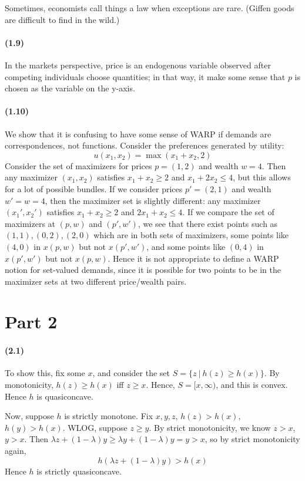 \documentclass[10pt,letter]{article}
\begin{document}
Sometimes, economists call things a law when exceptions are rare. (Giffen goods are difficult to find in the wild.)
\paragraph{(1.9)}
In the markets perspective, price is an endogenous variable observed after competing individuals choose quantities; in that way, it make some sense that $p$ is chosen as the variable on the y-axis.
\paragraph{(1.10)}
We show that it is confusing to have some sense of WARP if demands are correspondences, not functions. Consider the preferences generated by utility:
\[ u(x_1, x_2) = \max(x_1 + x_2, 2) \]
Consider the set of maximizers for prices $p = (1, 2)$ and wealth $w = 4$. Then any maximizer $(x_1, x_2)$ satisfies $x_1 + x_2 \ge 2$ and $x_1 + 2x_2 \le 4$, but this allows for a lot of possible bundles. If we consider prices $p' = (2, 1)$ and wealth $w' = w = 4$, then the maximizer set is slightly different: any maximizer $(x_1', x_2')$ satisfies $x_1 + x_2 \ge 2$ and $2x_1 + x_2 \le 4$. If we compare the set of maximizers at $(p, w)$ and $(p', w')$, we see that there exist points such as $(1,1), (0,2), (2,0)$ which are in both sets of maximizers, some points like $(4, 0)$ in $x(p,w)$ but not $x(p',w')$, and some points like $(0,4)$ in $x(p', w')$ but not $x(p,w)$. Hence it is not appropriate to define a WARP notion for set-valued demands, since it is possible for two points to be in the maximizer sets at two different price/wealth pairs.
\pagebreak
\section*{Part 2}
\paragraph{(2.1)}
To show this, fix some $x$, and consider the set $S = \{ z \ | \ h(z) \ge h(x) \}$. By monotonicity, $h(z) \ge h(x)$ iff $z \ge x$. Hence, $S = [x, \infty)$, and this is convex. Hence $h$ is quasiconcave.

Now, suppose $h$ is strictly monotone. Fix $x, y, z$, $h(z) > h(x)$, $h(y) > h(x)$. WLOG, suppose $z \ge y$. By strict monotonicity, we know $z > x$, $y > x$. Then $\lambda z + (1-\lambda)y \ge \lambda y + (1-\lambda)y = y > x$, so by strict monotonicity again,
\[ h(\lambda z + (1-\lambda) y) > h(x)  \]
Hence $h$ is strictly quasiconcave.
\end{document}
